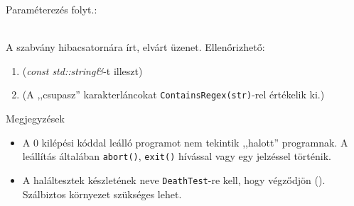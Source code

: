 \begin{frame}
  Paraméterezés folyt.:
  \begin{description}[mm]
    \item[\emph{matcher}] \hfill\\ A szabvány hibacsatornára írt, elvárt üzenet. Ellenőrizhető:
    \begin{enumerate}
      \item 
{} (\emph{const std::string\&}-t illeszt)
      \item 
{}  (A ,,csupasz'' karakterláncokat \texttt{ContainsRegex(str)}-rel értékelik ki.)
    \end{enumerate}
  \end{description}
  Megjegyzések
  \begin{itemize}
    \item A 0 kilépési kóddal leálló programot nem tekintik ,,halott'' programnak. A leállítás általában 
\texttt{abort()}, \texttt{exit()} hívással vagy egy jelzéssel történik.
    \item A haláltesztek készletének neve \texttt{DeathTest}-re kell, hogy végződjön 
(). 
Szálbiztos környezet szükséges lehet.
  \end{itemize}
\end{frame}
